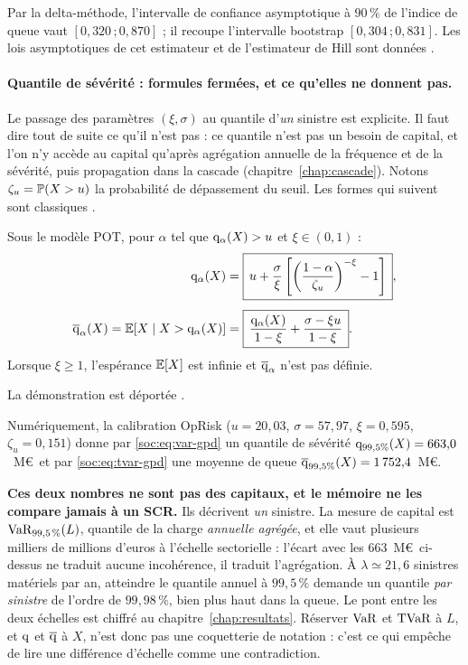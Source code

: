 \noindent Par la delta-méthode, l'intervalle de confiance asymptotique à $90\,\%$ de l'indice de
queue vaut $[0{,}320\,;0{,}870]$ ; il recoupe l'intervalle bootstrap $[0{,}304\,;0{,}831]$. Les
lois asymptotiques de cet estimateur et de l'estimateur de Hill sont données
\matcomp.

\paragraph{Quantile de sévérité : formules fermées, et ce qu'elles ne donnent pas.} Le passage des paramètres $(\xi,\sigma)$ au quantile d'\emph{un} sinistre est explicite. Il faut dire tout de suite ce qu'il n'est pas : ce quantile n'est pas un besoin de capital, et l'on n'y accède au capital qu'après agrégation annuelle de la fréquence et de la sévérité, puis propagation dans la cascade (chapitre~\ref{chap:cascade}). Notons $\zeta_u=\mathbb{P}(X>u)$ la probabilité de dépassement du seuil. Les formes qui suivent sont
classiques \citep{mcneil2015}.

\begin{proposition}\label{soc:prop:varestvar}
Sous le modèle POT, pour $\alpha$ tel que $\mathrm{q}_\alpha(X)>u$ et $\xi\in(0,1)$ :
\begin{align}
\mathrm{q}_\alpha(X) &= \boxed{\,u + \frac{\sigma}{\xi}\left[\left(\frac{1-\alpha}{\zeta_u}\right)^{-\xi}-1\right]\,},\label{soc:eq:var-gpd}\\[4pt]
\overline{\mathrm{q}}_\alpha(X) = \mathbb{E}[X\mid X>\mathrm{q}_\alpha(X)] &= \boxed{\,\frac{\mathrm{q}_\alpha(X)}{1-\xi}+\frac{\sigma-\xi u}{1-\xi}\,}.\label{soc:eq:tvar-gpd}
\end{align}
Lorsque $\xi\ge 1$, l'espérance $\mathbb{E}[X]$ est infinie et $\overline{\mathrm{q}}_\alpha$ n'est pas définie.
\end{proposition}

\noindent La démonstration est déportée \matcomp.

\noindent Numériquement, la calibration OpRisk ($u=20{,}03$, $\sigma=57{,}97$, $\xi=0{,}595$, $\zeta_u=0{,}151$) donne par \eqref{soc:eq:var-gpd} un quantile de sévérité $\mathrm{q}_{99{,}5\%}(X)=663{,}0$~M\euro\ et par \eqref{soc:eq:tvar-gpd} une moyenne de queue $\overline{\mathrm{q}}_{99{,}5\%}(X)=1\,752{,}4$~M\euro.

\begin{attention}
\textbf{Ces deux nombres ne sont pas des capitaux, et le mémoire ne les compare jamais à un SCR.}
Ils décrivent \emph{un} sinistre. La mesure de capital est $\mathrm{VaR}_{99{,}5\,\%}(L)$, quantile de la
charge \emph{annuelle agrégée}, et elle vaut plusieurs milliers de millions d'euros à l'échelle
sectorielle : l'écart avec les $663$~M\euro\ ci-dessus ne traduit aucune incohérence, il traduit
l'agrégation. À $\lambda\simeq21{,}6$ sinistres matériels par an, atteindre le quantile annuel à
$99{,}5\,\%$ demande un quantile \emph{par sinistre} de l'ordre de $99{,}98\,\%$, bien plus haut
dans la queue. Le pont entre les deux échelles est chiffré au chapitre~\ref{chap:resultats}.
Réserver $\mathrm{VaR}$ et $\mathrm{TVaR}$ à $L$, et $\mathrm{q}$ et $\overline{\mathrm{q}}$ à
$X$, n'est donc pas une coquetterie de notation : c'est ce qui empêche de lire une différence
d'échelle comme une contradiction.
\end{attention}

